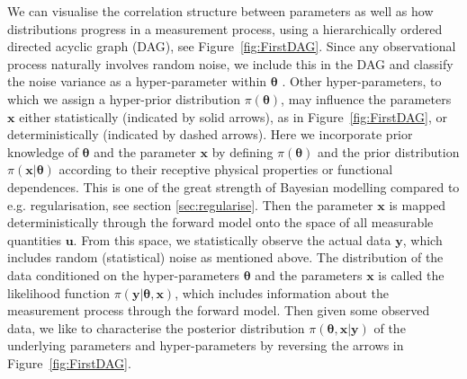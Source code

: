 We can visualise the correlation structure between parameters as well as how distributions progress in a measurement process, using a hierarchically ordered directed acyclic graph (DAG), see Figure~\ref{fig:FirstDAG}.
Since any observational process naturally involves random noise, we include this in the DAG and classify the noise variance as a hyper-parameter within $\bm{\theta}$ \cite{fox2016fast}.  
Other hyper-parameters, to which we assign a hyper-prior distribution $\pi(\bm{\theta})$, may influence the parameters $\bm{x}$ either statistically (indicated by solid arrows), as in Figure~\ref{fig:FirstDAG}, or deterministically (indicated by dashed arrows).
Here we incorporate prior knowledge of $\bm{\theta}$ and the parameter $\bm{x}$ by defining $\pi(\bm{\theta})$ and the prior distribution $\pi(\bm{x}|\bm{\theta})$ according to their receptive physical properties or functional dependences.
This is one of the great strength of Bayesian modelling compared to e.g. regularisation, see section \ref{sec:regularise}.
Then the parameter $\bm{x}$ is mapped deterministically through the forward model onto the space of all measurable quantities $\bm{u}$. From this space, we statistically observe the actual data $\bm{y}$, which includes random (statistical) noise as mentioned above.
The distribution of the data conditioned on the  hyper-parameters $\bm{\theta}$ and the parameters $\bm{x}$ is called the likelihood function $\pi(\bm{y}|\bm{\theta},\bm{x})$, which includes information about the measurement process through the forward model.
Then given some observed data, we like to characterise the posterior distribution $\pi(\bm{\theta}, \bm{x}|\bm{y})$ of the underlying parameters and hyper-parameters by reversing the arrows in Figure~\ref{fig:FirstDAG}. 
